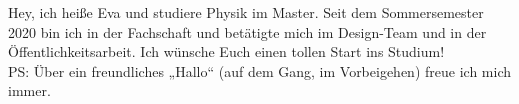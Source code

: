 \begin{multicols}{2}
{
Hey, ich heiße Eva und studiere Physik im Master. Seit dem Sommersemester 2020 bin ich in der Fachschaft und betätigte mich im Design-Team und in der Öffentlichkeitsarbeit.
Ich wünsche Euch einen tollen Start ins Studium! \\ PS: Über ein freundliches „Hallo“ (auf dem Gang, im Vorbeigehen) freue ich mich immer.
} 




\end{multicols}
